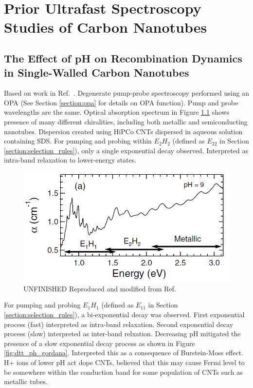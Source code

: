 \chapter{Prior Ultrafast Spectroscopy Studies of Carbon Nanotubes}


\section{The Effect of pH on Recombination Dynamics in Single-Walled Carbon Nanotubes}

Based on work in Ref.\ \cite{ostojic2004interband}. Degenerate pump-probe spectroscopy performed using an OPA (See Section \ref{section:opa} for details on OPA function). Pump and probe wavelengths are the same. Optical absorption spectrum in Figure \ref{fig:abs_gordana} shows presence of many different chiralities, including both metallic and semiconducting nanotubes. Dispersion created using HiPCo CNTs dispersed in aqueous solution containing SDS. For pumping and probing within $E_2 H_2$ (defined as $E_{22}$ in Section \ref{section:selection_rules}), only a single exponential decay observed. Interpreted as intra-band relaxation to lower-energy states. 

\begin{figure}[h]
	\centering
	\includegraphics[scale=0.7]{images/chapter_prior_works/abs_gordana}
	\caption{{\color{red} UNFINISHED } Reproduced and modified from Ref.\ \cite{ostojic2004interband}}
	\label{fig:abs_gordana}
\end{figure}

For pumping and probing $E_1 H_1$ (defined as $E_{11}$ in Section \ref{section:selection_rules}), a bi-exponential decay was observed. First exponential process (fast) interpreted as intra-band relaxation. Second exponential decay process (slow) interpreted as inter-band relxation. Decreasing pH mitigated the presence of a slow exponential decay process as shown in Figure \ref{fig:dtt_ph_gordana}. Interpreted this as a consequence of Burstein-Moss effect. H+ ions of lower pH act dope CNTs, believed that this may cause Fermi level to be somewhere within the conduction band for some population of CNTs such as metallic tubes. 

